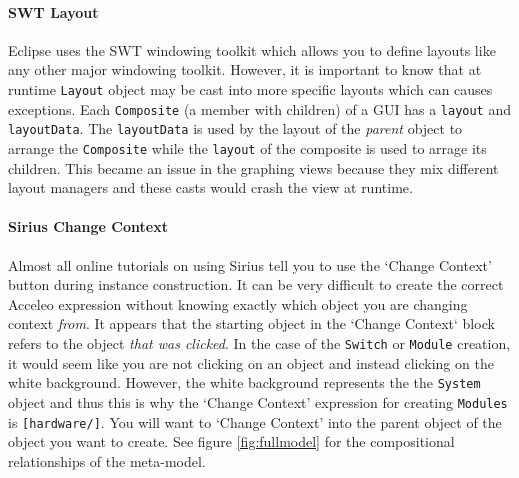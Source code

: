 \paragraph{SWT Layout} Eclipse uses the SWT windowing toolkit which allows you to define layouts like any other major windowing toolkit.
However, it is important to know that at runtime \texttt{Layout} object may be cast into more specific layouts which can causes exceptions.
Each \texttt{Composite} (a member with children) of a GUI has a \texttt{layout} and \texttt{layoutData}.
The \texttt{layoutData} is used by the layout of the \textit{parent} object to arrange the \texttt{Composite} while the \texttt{layout} of the composite is used to arrage its children.
This became an issue in the graphing views because they mix different layout managers and these casts would crash the view at runtime.

\paragraph{Sirius Change Context} Almost all online tutorials on using Sirius tell you to use the `Change Context' button during instance construction.
It can be very difficult to create the correct Acceleo expression without knowing exactly which object you are changing context \textit{from}.
It appears that the starting object in the `Change Context` block refers to the object \textit{that was clicked}.
In the case of the \texttt{Switch} or \texttt{Module} creation, it would seem like you are not clicking on an object and instead clicking on the white background.
However, the white background represents the the \texttt{System} object and thus this is why the `Change Context' expression for creating \texttt{Modules} is \texttt{[hardware/]}. 
You will want to `Change Context' into the parent object of the object you want to create. See figure \ref{fig:fullmodel} for the compositional relationships of the meta-model.
